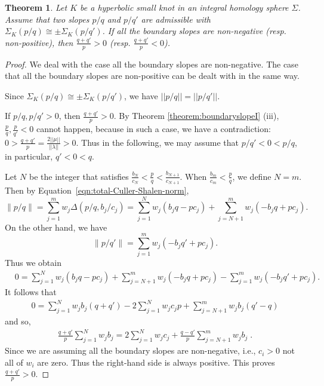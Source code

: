 \documentclass{amsart}
\newtheorem{theorem}{Theorem}[section]
\theoremstyle{remark}
\theoremstyle{definition}
\begin{document}
\begin{theorem}\label{theorem:boundaryslopeII}
Let $K$ be a hyperbolic small knot in an integral homology sphere $\Sigma$. 
Assume that two slopes $p/q$ and $p/q'$ are admissible with $\Sigma_{K}(p/q)\cong \pm \Sigma_{K}(p/q') $.
If all the boundary slopes are non-negative (resp. non-positive), then $\frac{q+q'}{p}> 0$ (resp. $\frac{q+q'}{p} <0$).
\end{theorem}
\begin{proof}
We deal with the case all the boundary slopes are non-negative. 
The case that all the boundary slopes are non-positive can be dealt with in the same way. 

Since $\Sigma_{K}(p/q)\cong \pm \Sigma_{K}(p/q') $, we have $||p/q||=||p/q'||$.

If $p/q,p/q'>0$, then $\frac{q+q'}{p}>0$.
By Theorem \ref{theorem:boundaryslopeI} (iii), $\frac{p}{q}, \frac{p}{q'}<0$ cannot happen, 
because in such a case, we have a contradiction: $0>\frac{q+q'}{p} = \frac{2||\mu||}{|| \lambda||}>0$. 
Thus in the following, we may assume that $p/q'<0<p/q$, in particular, $q'<0<q$.

Let $N$ be the integer that satisfies $\frac{b_N}{c_{N}} < \frac{p}{q} < \frac{b_{N+1}}{c_{N+1}}$. 
When $\frac{b_{m}}{c_m} <\frac{p}{q}$, we define $N=m$.
Then by Equation~\eqref{eqn:total-Culler-Shalen-norm}, 
\[
\left\|p/q \right\| = \sum_{j=1}^{m} w_{j}\Delta \left(p/q, b_j/c_j\right)= \sum_{j=1}^{N} w_{j}(b_{j}q-pc_{j}) + \sum_{j=N+1}^{m}w_{j}(-b_{j}q+pc_{j}).
\]
On the other hand, we have 
\[ \left\|p/q' \right\| =\sum_{j=1}^{m}w_{j}(-b_{j}q'+pc_{j}). \]
Thus we obtain 
\begin{align*}
 &0=\sum_{j=1}^{N} w_{j}(b_{j}q-pc_{j}) + \sum_{j=N+1}^{m}w_{j}(-b_{j}q+pc_{j})- \sum_{j=1}^{m}w_{j}(-b_{j}q'+pc_{j}).
 \end{align*}
It follows that 
\begin{align*}
0= \sum_{j=1}^{N}w_{j}b_{j}(q+q') -2 \sum_{j=1}^{N} w_{j}c_{j}p + \sum_{j=N+1}^{m}w_{j}b_{j}(q'-q) 
\end{align*}
and so, 
\begin{align*}
\frac{q+q'}{p} \sum_{j=1}^{N}w_{j}b_{j}= 2 \sum_{j=1}^{N}w_j c_j +\frac{q-q'}{p}\sum_{j=N+1}^{m} w_{j} b_{j} \;.
\end{align*}
Since we are assuming all the boundary slopes are non-negative, i.e., %
$c_i>0$ not all of $w_{i}$ are zero. Thus the right-hand side is always positive. This proves $\frac{q+q'}{p} > 0$.
\end{proof}
\end{document}
